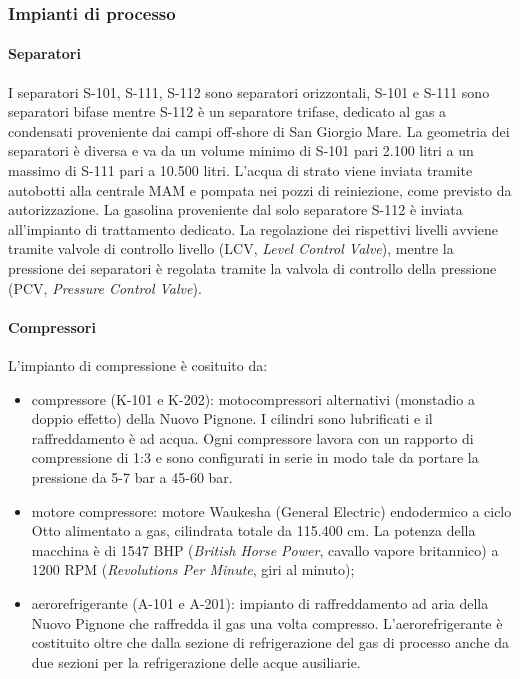 \subsubsection{Impianti di processo}
\paragraph{Separatori}
I separatori S-101, S-111, S-112 sono separatori orizzontali, S-101 e S-111 sono separatori bifase mentre S-112 è un separatore trifase, dedicato al gas a condensati proveniente dai campi off-shore di San Giorgio Mare. La geometria dei separatori è diversa e va da un volume minimo di S-101 pari 2.100 litri a un massimo di S-111 pari a 10.500 litri. L'acqua di strato viene  inviata tramite autobotti alla centrale MAM e pompata nei pozzi di reiniezione, come previsto da autorizzazione. La gasolina proveniente dal solo separatore S-112 è inviata all'impianto di trattamento dedicato.
La regolazione dei rispettivi livelli avviene tramite valvole di controllo livello (LCV, \textit{Level Control Valve}), mentre la pressione dei separatori è regolata tramite la valvola di controllo della pressione (PCV, \textit{Pressure Control Valve}).

\paragraph{Compressori}
L'impianto di compressione è cosituito da:
\begin{itemize}
	\item compressore (K-101 e K-202): motocompressori alternativi (monstadio a doppio effetto) della Nuovo Pignone. I cilindri sono lubrificati e il raffreddamento è ad acqua. Ogni compressore lavora con un rapporto di compressione di 1:3 e sono configurati in serie in modo tale da portare la pressione da 5-7 bar a 45-60 bar.
	\item motore compressore: motore Waukesha (General Electric) endodermico a ciclo Otto alimentato a gas, cilindrata totale da 115.400 cm. La potenza della macchina è di 1547 BHP (\textit{British Horse Power}, cavallo vapore britannico) a 1200 RPM (\textit{Revolutions Per Minute}, giri al minuto);
	\item aerorefrigerante (A-101 e A-201): impianto di raffreddamento ad aria della Nuovo Pignone che raffredda il gas una volta compresso. L'aerorefrigerante è costituito oltre che dalla sezione di refrigerazione del gas di processo anche da due sezioni per la refrigerazione delle acque ausiliarie.
\end {itemize}

